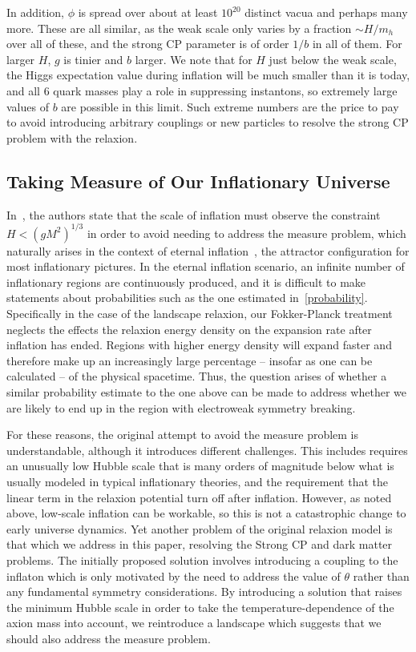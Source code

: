 \documentclass[12pt,aps,prd,showpacs,notitlepage,nofootinbib]{revtex4-1}
\begin{document}
In addition, $\phi$ is spread over about at least $10^{20}$ distinct vacua and perhaps many more. These are all similar, as the weak scale only varies by a fraction $\sim H/m_h$  over all of  these, and the strong CP parameter is of order $1/b$ in all of them. For larger $H$, $g$ is tinier and $b$ larger. We note that for $H$ just below the weak scale, the Higgs expectation value during inflation will be much smaller than it is today, and all 6 quark masses play a role in suppressing instantons, so extremely large values of $b$ are possible in this limit. Such extreme numbers are the price to pay to avoid  introducing   arbitrary couplings or new particles to resolve the strong CP problem with the relaxion.

\subsection{Taking Measure of Our Inflationary Universe}
In~\cite{Graham:2015cka}, the authors state that the scale of inflation must observe the constraint $H < (g M^2)^{1/3}$ in order to avoid needing to address the measure problem, which naturally arises in the context of eternal inflation~\cite{LINDE1986395}, the attractor configuration for most inflationary pictures. In the eternal inflation scenario, an infinite number of inflationary regions are continuously produced, and it is difficult to make statements about probabilities such as the one estimated in~\ref{probability}. Specifically in the case of the landscape relaxion, our Fokker-Planck treatment neglects the effects the relaxion energy density on the expansion rate after inflation has ended.  Regions with higher energy density will expand faster and therefore make up an increasingly large percentage -- insofar as one can be calculated -- of the physical spacetime. Thus, the question arises of whether a similar probability estimate to the one above can be made to address whether we are likely to end up in the region with electroweak symmetry breaking.

For these reasons, the original attempt to avoid the measure problem is understandable, although it introduces different challenges. This includes requires an unusually low Hubble scale that is many orders of magnitude below what is usually modeled in typical inflationary theories, and the requirement that the linear term in the relaxion potential turn off after inflation. However, as noted above, low-scale inflation can be workable, so this is not a catastrophic change to early universe dynamics. Yet another problem of the original relaxion model is that which we address in this paper, resolving the Strong CP and dark matter problems. The initially proposed solution involves introducing a coupling to the inflaton which is only motivated by the need to address the value of $\theta$ rather than any fundamental symmetry considerations. By introducing a solution that raises the minimum Hubble scale in order to take the temperature-dependence of the axion mass into account, we reintroduce a landscape which suggests that we should also address the measure problem.
\end{document}
